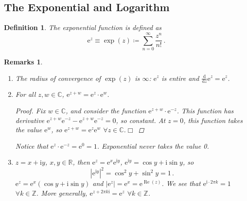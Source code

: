 \documentclass{article}
\theoremstyle{plain}\theoremheaderfont{\normalfont\itshape}\theorembodyfont{\rmfamily}\theoremseparator{.}\newtheorem*{rem}{Remark}\newtheorem*{ex}{Example}\newtheorem*{proof}{Proof}\newtheorem*{altp}{Alternative proof}\newtheorem*{con}{Consequences}\newtheorem*{notn}{Notations}\newtheorem*{cau}{Caution}\newtheorem*{term}{Terminology}\newtheorem*{keyex}{Key example}
\theoremstyle{plain}\theoremheaderfont{\normalfont\bfseries}\theorembodyfont{\rmfamily}\theoremseparator{.}\newtheorem{thm}{Theorem}[section]\newtheorem{lem}[thm]{Lemma}\newtheorem{prop}[thm]{Proposition}\newtheorem*{cor}{Corollary}\newtheorem{defn}[thm]{Definition}\newtheorem{clm}[thm]{Claim}\newtheorem{clminproof}{Claim}\newtheorem{leminproof}{Lemma}\newtheorem{app}{Application}
\theoremstyle{break}\theoremheaderfont{\normalfont\itshape}\theorembodyfont{\rmfamily}\theoremseparator{.\medskip}\newtheorem*{proofskip}{Proof}\newtheorem*{exs}{Examples}\newtheorem*{rems}{Remarks}\newtheorem*{rec}{Recall}\newtheorem*{ppts}{Properties}
\theoremstyle{break}\theoremheaderfont{\normalfont\bfseries}\theorembodyfont{\rmfamily}\theoremseparator{.\medskip}\newtheorem{lemskip}[thm]{Lemma}\newtheorem{defnskip}[thm]{Definition}\newtheorem{propskip}[thm]{Proposition}\newtheorem{thmskip}[thm]{Theorem}
\numberwithin{equation}{section}
\newcommand{\ii}{\mathrm{i}}
\newcommand{\ee}{\mathrm{e}}
\newcommand{\qed}{\hfill\ensuremath{\Box}}
\newcommand{\abs}[1]{\left|#1\right|}
\newcommand{\ZZ}{\mathbb{Z}}
\newcommand{\RR}{\mathbb{R}}
\newcommand{\CC}{\mathbb{C}}
\newcommand{\dv}[2]{\frac{\mathrm{d}#1}{\mathrm{d}#2}}
\renewcommand{\Re}{\operatorname{Re}}
\begin{document}
    \subsection{The Exponential and Logarithm}
    \begin{defn}
        The exponential function is defined as
        \[ \ee^z\equiv \exp(z)\coloneqq \sum_{n=0}^{\infty}\frac{z^n}{n!}\,. \]
    \end{defn}
    \begin{rems}
        \begin{enumerate}[topsep=0pt,label=(\roman*)]
            \item The radius of convergence of \(\exp(z)\) is \(\infty\): \(\ee^z\) is entire and \(\dv{}{z}\ee^z=\ee^z\).
            \item For all \(z,w\in\CC\), \(\ee^{z+w}=\ee^z\cdot \ee^w\).
            \begin{proof}
                Fix \(w\in\CC\), and consider the function \(\ee^{z+w}\cdot \ee^{-z}\). This function has derivative \(\ee^{z+w}\ee^{-z}-\ee^{z+w}\ee^{-z}=0\), so constant. At \(z=0\), this function takes the value \(\ee^w\), so \(\ee^{z+w}=\ee^{z}\ee^{w}\) \(\forall z\in\CC\).\qed
            \end{proof}
            Notice that \(\ee^z\cdot \ee^{-z}=\ee^0=1\). Exponential never takes the value 0.
            \item \(z=x+\ii y\), \(x,y\in\RR\), then \(\ee^{z}=\ee^{x}\ee^{\ii y}\), \(\ee^{\ii y}=\cos y+\ii\sin y\), so
            \[\abs{\ee^{\ii y}}^2=\cos^2 y+\sin^2 y=1\,.\]
            \(\ee^z=\ee^x(\cos y+\ii\sin y)\) and \(\abs{\ee^z}=\ee^x=\ee^{\Re(z)}\). We see that \(\ee^{\ii \cdot 2\pi k}=1\) \(\forall k\in\ZZ\). More generally, \(\ee^{z+2\pi k\ii}=\ee^z\) \(\forall k\in\ZZ\).
            \begin{figure}[ht!]
                \centering
            \end{figure}
        \end{enumerate}
    \end{rems}
\end{document}
